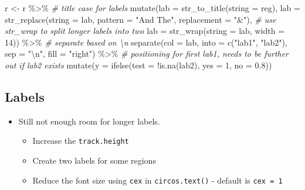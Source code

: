 \documentclass[
]{book}
\newenvironment{Shaded}{\begin{snugshade}}{\end{snugshade}}
\newcommand{\AttributeTok}[1]{\textcolor[rgb]{0.77,0.63,0.00}{#1}}
\newcommand{\CommentTok}[1]{\textcolor[rgb]{0.56,0.35,0.01}{\textit{#1}}}
\newcommand{\DecValTok}[1]{\textcolor[rgb]{0.00,0.00,0.81}{#1}}
\newcommand{\FloatTok}[1]{\textcolor[rgb]{0.00,0.00,0.81}{#1}}
\newcommand{\FunctionTok}[1]{\textcolor[rgb]{0.00,0.00,0.00}{#1}}
\newcommand{\NormalTok}[1]{#1}
\newcommand{\OtherTok}[1]{\textcolor[rgb]{0.56,0.35,0.01}{#1}}
\newcommand{\SpecialCharTok}[1]{\textcolor[rgb]{0.00,0.00,0.00}{#1}}
\newcommand{\StringTok}[1]{\textcolor[rgb]{0.31,0.60,0.02}{#1}}
\providecommand{\tightlist}{%
  \setlength{\itemsep}{0pt}\setlength{\parskip}{0pt}}
\begin{document}
\begin{Shaded}
\begin{Highlighting}[]
\NormalTok{r }\OtherTok{\textless{}{-}}\NormalTok{ r }\SpecialCharTok{\%\textgreater{}\%}
  \CommentTok{\# title case for labels}
  \FunctionTok{mutate}\NormalTok{(}\AttributeTok{lab =} \FunctionTok{str\_to\_title}\NormalTok{(}\AttributeTok{string =}\NormalTok{ reg),}
         \AttributeTok{lab =} \FunctionTok{str\_replace}\NormalTok{(}\AttributeTok{string =}\NormalTok{ lab, }\AttributeTok{pattern =} \StringTok{"And The"}\NormalTok{, }\AttributeTok{replacement =} \StringTok{"\&"}\NormalTok{),}
  \CommentTok{\# use str\_wrap to split longer labels into two}
         \AttributeTok{lab =} \FunctionTok{str\_wrap}\NormalTok{(}\AttributeTok{string =}\NormalTok{ lab, }\AttributeTok{width =} \DecValTok{14}\NormalTok{)) }\SpecialCharTok{\%\textgreater{}\%}
  \CommentTok{\# separate based on \textbackslash{}n}
  \FunctionTok{separate}\NormalTok{(}\AttributeTok{col =}\NormalTok{ lab, }\AttributeTok{into =} \FunctionTok{c}\NormalTok{(}\StringTok{"lab1"}\NormalTok{, }\StringTok{"lab2"}\NormalTok{), }\AttributeTok{sep =} \StringTok{"}\SpecialCharTok{\textbackslash{}n}\StringTok{"}\NormalTok{, }\AttributeTok{fill =} \StringTok{"right"}\NormalTok{) }\SpecialCharTok{\%\textgreater{}\%}
  \CommentTok{\# positioning for first lab1, needs to be further out if lab2 exists}
  \FunctionTok{mutate}\NormalTok{(}\AttributeTok{y =} \FunctionTok{ifelse}\NormalTok{(}\AttributeTok{test =} \SpecialCharTok{!}\FunctionTok{is.na}\NormalTok{(lab2), }\AttributeTok{yes =} \DecValTok{1}\NormalTok{, }\AttributeTok{no =} \FloatTok{0.8}\NormalTok{))}
\end{Highlighting}
\end{Shaded}

\hypertarget{labels-4}{%
\subsection{Labels}\label{labels-4}}

\begin{itemize}
\tightlist
\item
  Still not enough room for longer labels.

  \begin{itemize}
  \tightlist
  \item
    Increase the \texttt{track.height}
  \item
    Create two labels for some regions
  \item
    Reduce the font size using \texttt{cex} in \texttt{circos.text()} - default is \texttt{cex\ =\ 1}
  \end{itemize}
\end{itemize}
\end{document}
